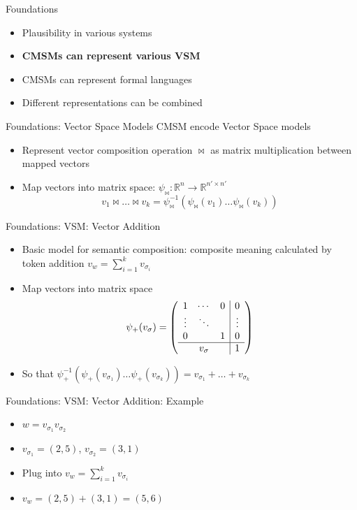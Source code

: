 \documentclass[12pt,a4paper]{beamer}
\begin{document}
\begin{frame}{Foundations}
\begin{itemize}
\item Plausibility in various systems
\item \textbf{CMSMs can represent various VSM}
\item CMSMs can represent formal languages
\item Different representations can be combined
\end{itemize}
\end{frame}


\begin{frame}{Foundations: Vector Space Models}
CMSM encode Vector Space models
\begin{itemize}
\item Represent vector composition operation $\bowtie$ as matrix multiplication between mapped vectors
\item Map vectors into matrix space: $\psi_{\bowtie}: \mathbb{R}^{n} \to \mathbb{R}^{n'\times n'} $
$$ v_{1} \bowtie \ldots \bowtie v_{k} = \psi_{\bowtie}^{-1}(\psi_{\bowtie}(v_{1}) \ldots \psi_{\bowtie}(v_{k}) )$$
\end{itemize}
\end{frame}


\begin{frame}{Foundations: VSM: Vector Addition}
\begin{itemize}
\item Basic model for semantic composition: composite meaning calculated by token addition $v_{w} = \sum_{i=1}^{k}v_{\sigma_{i}}$
\item Map vectors into matrix space
$$  \psi_{+}(v_{\sigma}) =
\left( \begin{array}{ccc|c}
1 & \cdots & 0 & 0 \\
\vdots & \ddots & & \vdots \\
0 &  & 1 & 0 \\ \hline
&  v_{\sigma} & & 1 \end{array} \right) $$
\item So that $\psi_{+}^{-1} (\psi_{+}(v_{\sigma_{1}}) \ldots \psi_{+}(v_{\sigma_{k}})) = v_{\sigma_{1}} + \ldots + v_{\sigma_{k}}$
\end{itemize}
\end{frame}

\begin{frame}{Foundations: VSM: Vector Addition: Example}
\begin{itemize}
\item $w = v_{\sigma_{1}}v_{\sigma_{2}}$
\item $v_{\sigma_{1}} = (2,5)$, $v_{\sigma_{2}} = (3,1)$
\item Plug into $v_{w} = \sum_{i=1}^{k}v_{\sigma_{i}}$
\item $v_{w} = (2,5)+(3,1) = (5,6)$
\end{itemize}
\end{frame}
\end{document}
